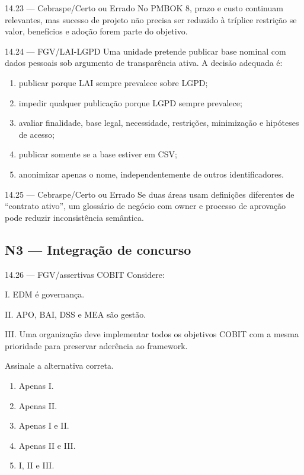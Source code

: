 \begin{questao}{ 14.23 — Cebraspe/Certo ou Errado}
No PMBOK 8, prazo e custo continuam relevantes, mas sucesso de projeto não precisa ser reduzido à tríplice restrição se valor, benefícios e adoção forem parte do objetivo.
\end{questao}

\begin{questao}{ 14.24 — FGV/LAI-LGPD}
Uma unidade pretende publicar base nominal com dados pessoais sob argumento de transparência ativa. A decisão adequada é:
\begin{enumerate}[label=\Alph*)]
\item publicar porque LAI sempre prevalece sobre LGPD;
\item impedir qualquer publicação porque LGPD sempre prevalece;
\item avaliar finalidade, base legal, necessidade, restrições, minimização e hipóteses de acesso;
\item publicar somente se a base estiver em CSV;
\item anonimizar apenas o nome, independentemente de outros identificadores.
\end{enumerate}
\end{questao}

\begin{questao}{ 14.25 — Cebraspe/Certo ou Errado}
Se duas áreas usam definições diferentes de ``contrato ativo'', um glossário de negócio com owner e processo de aprovação pode reduzir inconsistência semântica.
\end{questao}

\subsection*{N3 — Integração de concurso}

\begin{questao}{ 14.26 — FGV/assertivas COBIT}
Considere:

I. EDM é governança.

II. APO, BAI, DSS e MEA são gestão.

III. Uma organização deve implementar todos os objetivos COBIT com a mesma prioridade para preservar aderência ao framework.

Assinale a alternativa correta.
\begin{enumerate}[label=\Alph*)]
\item Apenas I.
\item Apenas II.
\item Apenas I e II.
\item Apenas II e III.
\item I, II e III.
\end{enumerate}
\end{questao}

